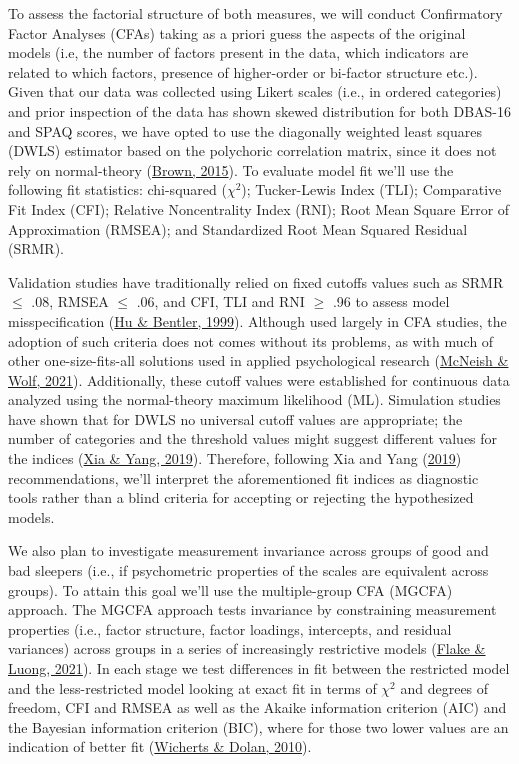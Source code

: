 \documentclass[
  ,doc,11pt, twoside,floatsintext]{apa6}
\begin{document}
To assess the factorial structure of both measures, we will conduct Confirmatory Factor Analyses (CFAs) taking as a priori guess the aspects of the original models (i.e, the number of factors present in the data, which indicators are related to which factors, presence of higher-order or bi-factor structure etc.). Given that our data was collected using Likert scales (i.e., in ordered categories) and prior inspection of the data has shown skewed distribution for both DBAS-16 and SPAQ scores, we have opted to use the diagonally weighted least squares (DWLS) estimator based on the polychoric correlation matrix, since it does not rely on normal-theory (\protect\hyperlink{ref-brown2015}{Brown, 2015}). To evaluate model fit we'll use the following fit statistics: chi-squared (\(\chi^2\)); Tucker-Lewis Index (TLI); Comparative Fit Index (CFI); Relative Noncentrality Index (RNI); Root Mean Square Error of Approximation (RMSEA); and Standardized Root Mean Squared Residual (SRMR).

Validation studies have traditionally relied on fixed cutoffs values such as SRMR \(\le\) .08, RMSEA \(\le\) .06, and CFI, TLI and RNI \(\ge\) .96 to assess model misspecification (\protect\hyperlink{ref-hu1999}{Hu \& Bentler, 1999}). Although used largely in CFA studies, the adoption of such criteria does not comes without its problems, as with much of other one-size-fits-all solutions used in applied psychological research (\protect\hyperlink{ref-mcneish2021}{McNeish \& Wolf, 2021}). Additionally, these cutoff values were established for continuous data analyzed using the normal-theory maximum likelihood (ML). Simulation studies have shown that for DWLS no universal cutoff values are appropriate; the number of categories and the threshold values might suggest different values for the indices (\protect\hyperlink{ref-xia2019}{Xia \& Yang, 2019}). Therefore, following Xia and Yang (\protect\hyperlink{ref-xia2019}{2019}) recommendations, we'll interpret the aforementioned fit indices as diagnostic tools rather than a blind criteria for accepting or rejecting the hypothesized models.

We also plan to investigate measurement invariance across groups of good and bad sleepers (i.e., if psychometric properties of the scales are equivalent across groups). To attain this goal we'll use the multiple-group CFA (MGCFA) approach. The MGCFA approach tests invariance by constraining measurement properties (i.e., factor structure, factor loadings, intercepts, and residual variances) across groups in a series of increasingly restrictive models (\protect\hyperlink{ref-flake2021}{Flake \& Luong, 2021}). In each stage we test differences in fit between the restricted model and the less-restricted model looking at exact fit in terms of \(\chi^2\) and degrees of freedom, CFI and RMSEA as well as the Akaike information criterion (AIC) and the Bayesian information criterion (BIC), where for those two lower values are an indication of better fit (\protect\hyperlink{ref-wicherts2010}{Wicherts \& Dolan, 2010}).
\end{document}
